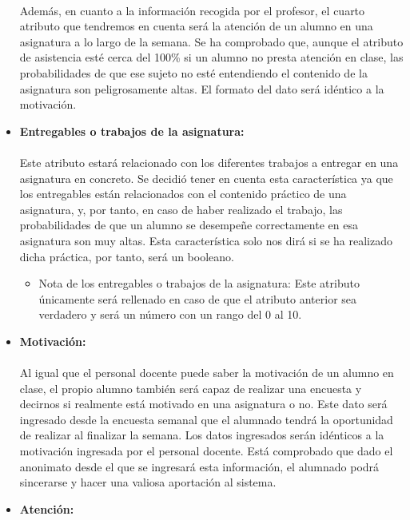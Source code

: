 \begin{itemize}
\paragraph{}
Además, en cuanto a la información recogida por el profesor, el cuarto atributo que tendremos en cuenta será la atención de un alumno en una asignatura a lo largo de la semana. Se ha comprobado que, aunque el atributo de asistencia esté cerca del 100\% si un alumno no presta atención en clase, las probabilidades de que ese sujeto no esté entendiendo el contenido de la asignatura son peligrosamente altas. El formato del dato será idéntico a la motivación.
\item \textbf{Entregables o trabajos de la asignatura:}
\paragraph{}
Este atributo estará relacionado con los diferentes trabajos a entregar en una asignatura en concreto. Se decidió tener en cuenta esta característica ya que los entregables están relacionados con el contenido práctico de una asignatura, y, por tanto, en caso de haber realizado el trabajo, las probabilidades de que un alumno se desempeñe correctamente en esa asignatura son muy altas. Esta característica solo nos dirá si se ha realizado dicha práctica, por tanto, será un booleano.
\begin{itemize}
\item{Nota de los entregables o trabajos de la asignatura:} Este atributo únicamente será rellenado en caso de que el atributo anterior sea verdadero y será un número con un rango del 0 al 10.
\end{itemize}
\item \textbf{Motivación:}
\paragraph{}
Al igual que el personal docente puede saber la motivación de un alumno en clase, el propio alumno también será capaz de realizar una encuesta y decirnos si realmente está motivado en una asignatura o no. Este dato será ingresado desde la encuesta semanal que el alumnado tendrá la oportunidad de realizar al finalizar la semana. Los datos ingresados serán idénticos a la motivación ingresada por el personal docente. Está comprobado que dado el anonimato desde el que se ingresará esta información, el alumnado podrá sincerarse y hacer una valiosa aportación al sistema.
\item \textbf{Atención:}

\end{itemize}
